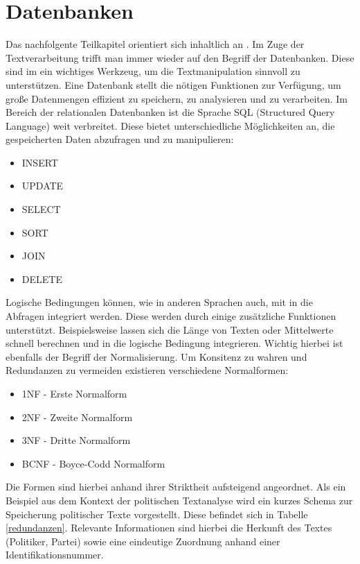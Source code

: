 \section{Datenbanken}
Das nachfolgente Teilkapitel orientiert sich inhaltlich an \cite{datenbanken}.
Im Zuge der Textverarbeitung trifft man immer wieder auf den Begriff der Datenbanken. Diese sind im ein wichtiges Werkzeug, um die Textmanipulation sinnvoll zu unterstützen. Eine Datenbank stellt die nötigen Funktionen zur Verfügung, um große Datenmengen effizient zu speichern, zu analysieren und zu verarbeiten. Im Bereich der relationalen Datenbanken ist die Sprache SQL (Structured Query Language) weit verbreitet. Diese bietet unterschiedliche Möglichkeiten an, die gespeicherten Daten abzufragen und zu manipulieren:
\begin{itemize}
\item INSERT
\item UPDATE
\item SELECT
\item SORT
\item JOIN
\item DELETE
\end{itemize}
Logische Bedingungen können, wie in anderen Sprachen auch, mit in die Abfragen integriert werden. Diese werden durch einige zusätzliche Funktionen unterstützt. Beispielsweise lassen sich die Länge von Texten oder Mittelwerte schnell berechnen und in die logische Bedingung integrieren.
Wichtig hierbei ist ebenfalls der Begriff der Normalisierung. Um Konsitenz zu wahren und Redundanzen zu vermeiden existieren verschiedene Normalformen:
\begin{itemize}
\item 1NF - Erste Normalform
\item 2NF - Zweite Normalform
\item 3NF - Dritte Normalform
\item BCNF - Boyce-Codd Normalform
\end{itemize}
Die Formen sind hierbei anhand ihrer Striktheit aufsteigend angeordnet. Als ein Beispiel aus dem Kontext der politischen Textanalyse wird ein kurzes Schema zur Speicherung politischer Texte vorgestellt. Diese befindet sich in Tabelle \ref{redundanzen}. Relevante Informationen sind hierbei die Herkunft des Textes (Politiker, Partei) sowie eine eindeutige Zuordnung anhand einer Identifikationsnummer. \\
